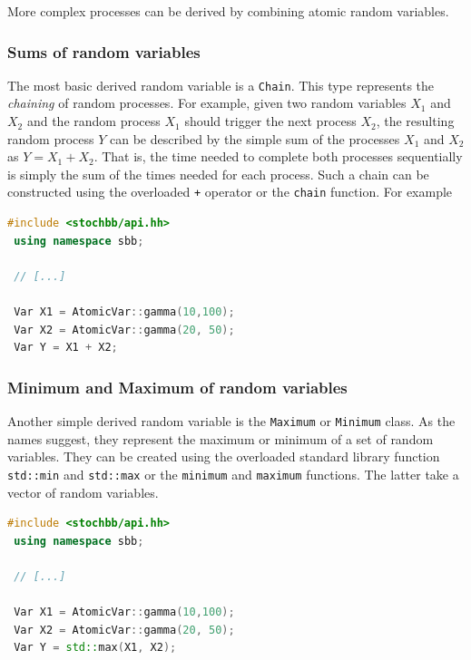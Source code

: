 \documentclass[a4paper, 10pt]{paper}
\newcommand{\code}[1]{\texttt{#1}}
\newcommand{\class}[1]{\code{#1}}
\newcommand{\function}[1]{\code{#1}}
\begin{document}
More complex processes can be derived by combining atomic random variables.

\subsubsection{Sums of random variables}
The most basic derived random variable is a \class{Chain}. This type represents the \emph{chaining} of
random processes. For example, given two random variables $X_1$ and $X_2$ and the random
process $X_1$ should trigger the next process $X_2$, the resulting random process $Y$
can be described by the simple sum of the processes $X_1$ and $X_2$ as $Y=X_1+X_2$.
That is, the time needed to complete both processes sequentially is simply the sum of the times
needed for each process. Such a chain can be constructed using the overloaded \code{+} operator
or the \function{chain} function. For example
\begin{lstlisting}[language=C++]
 #include <stochbb/api.hh>
 using namespace sbb;

 // [...]

 Var X1 = AtomicVar::gamma(10,100);
 Var X2 = AtomicVar::gamma(20, 50);
 Var Y = X1 + X2;
\end{lstlisting}

\subsubsection{Minimum and Maximum of random variables}
Another simple derived random variable is the \class{Maximum} or \class{Minimum} class. As the
names suggest, they represent the maximum or minimum of a set of random variables. They can be
created using the overloaded standard library function \function{std::min} and \function{std::max} or the
\function{minimum} and \function{maximum} functions. The latter take a vector of random variables.
\begin{lstlisting}[language=C++]
 #include <stochbb/api.hh>
 using namespace sbb;

 // [...]

 Var X1 = AtomicVar::gamma(10,100);
 Var X2 = AtomicVar::gamma(20, 50);
 Var Y = std::max(X1, X2);
\end{lstlisting}
\end{document}
